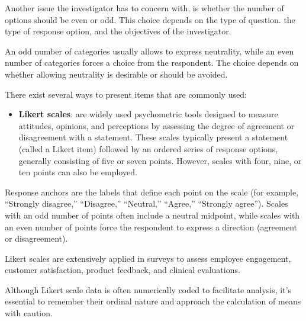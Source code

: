 \documentclass[
  letterpaper,
  DIV=11,
  numbers=noendperiod]{scrartcl}
\providecommand{\tightlist}{%
  \setlength{\itemsep}{0pt}\setlength{\parskip}{0pt}}\usepackage{longtable,booktabs,array}
\begin{document}
Another issue the investigator has to concern with, is whether the
number of options should be even or odd. This choice depends on the type
of question. the type of response option, and the objectives of the
investigator.

An odd number of categories usually allows to express neutrality, while
an even number of categories forces a choice from the respondent. The
choice depends on whether allowing neutrality is desirable or should be
avoided.

There exist several ways to present items that are commonly used:

\begin{itemize}
\tightlist
\item
  \textbf{Likert scales}: are widely used psychometric tools designed to
  measure attitudes, opinions, and perceptions by assessing the degree
  of agreement or disagreement with a statement. These scales typically
  present a statement (called a Likert item) followed by an ordered
  series of response options, generally consisting of five or seven
  points. However, scales with four, nine, or ten points can also be
  employed.
\end{itemize}

Response anchors are the labels that define each point on the scale (for
example, ``Strongly disagree,'' ``Disagree,'' ``Neutral,'' ``Agree,''
``Strongly agree''). Scales with an odd number of points often include a
neutral midpoint, while scales with an even number of points force the
respondent to express a direction (agreement or disagreement).

Likert scales are extensively applied in surveys to assess employee
engagement, customer satisfaction, product feedback, and clinical
evaluations.

\begin{tcolorbox}[enhanced jigsaw, opacitybacktitle=0.6, toptitle=1mm, title=\textcolor{quarto-callout-warning-color}{\faExclamationTriangle}\hspace{0.5em}{Warning}, coltitle=black, colframe=quarto-callout-warning-color-frame, titlerule=0mm, breakable, left=2mm, bottomtitle=1mm, arc=.35mm, colback=white, rightrule=.15mm, colbacktitle=quarto-callout-warning-color!10!white, toprule=.15mm, opacityback=0, leftrule=.75mm, bottomrule=.15mm]

Although Likert scale data is often numerically coded to facilitate
analysis, it's essential to remember their ordinal nature and approach
the calculation of means with caution.

\end{tcolorbox}
\end{document}
